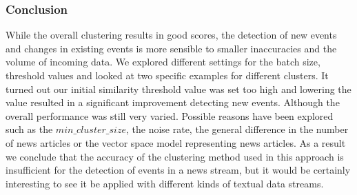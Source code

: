 \subsubsection{Conclusion}

While the overall clustering results in good scores, the detection of new events and changes in existing events is more sensible to smaller inaccuracies and the volume of incoming data. We explored different settings for the batch size, threshold values and looked at two specific examples for different clusters. It turned out our initial similarity threshold value was set too high and lowering the value resulted in a significant improvement detecting new events. Although the overall performance was still very varied. Possible reasons have been explored such as the $min\_cluster\_size$, the noise rate, the general difference in the number of news articles or the vector space model representing news articles. As a result we conclude that the accuracy of the clustering method used in this approach is insufficient for the detection of events in a news stream, but it would be certainly interesting to see it be applied with different kinds of textual data streams. 